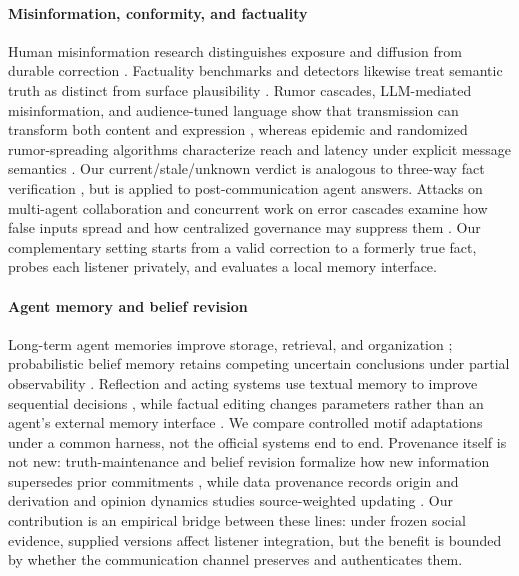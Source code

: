 \documentclass[sigconf,anonymous]{acmart}
\begin{document}
\paragraph{Misinformation, conformity, and factuality}
Human misinformation research distinguishes exposure and diffusion from durable correction
\cite{lazer2018science,vosoughi2018spread,lewandowsky2012misinformation,thorson2016belief}.
Factuality benchmarks and detectors likewise treat semantic truth as distinct from surface
plausibility
\cite{lin2022truthfulqa,manakul2023selfcheckgpt,farquhar2024detecting,li2023halueval,
niu2024ragtruth}.  Rumor cascades, LLM-mediated misinformation, and audience-tuned language show
that transmission can transform both content and expression
\cite{friggeri2014rumor,maurya2025simulating,beukeboom2019stereotypes,ye2021audience}, whereas
epidemic and randomized rumor-spreading algorithms characterize reach and latency under explicit
message semantics \cite{demers1987epidemic,karp2000rumor}.  Our
current/stale/unknown verdict is analogous to three-way fact verification
\cite{thorne2018fever}, but is applied to post-communication agent answers.  Attacks on
multi-agent collaboration and concurrent work on error cascades examine how false inputs spread
and how centralized governance may suppress them
\cite{amayuelas2024multiagent,xie2026spark}.  Our complementary setting starts from a valid
correction to a formerly true fact, probes each listener privately, and evaluates a local memory
interface.

\paragraph{Agent memory and belief revision}
Long-term agent memories improve storage, retrieval, and organization
\cite{zhong2024memorybank,packer2024memgpt,xu2025amem,chhikara2025mem0}; probabilistic belief
memory retains competing uncertain conclusions under partial observability
\cite{liao2026belief}.  Reflection and acting systems use textual memory to improve sequential
decisions \cite{shinn2023reflexion,yao2023react,wang2023voyager}, while factual editing changes
parameters rather than an agent's external memory interface \cite{meng2022rome,meng2023memit}.
We compare controlled motif adaptations under a common harness, not the official systems end to
end.  Provenance itself is not new: truth-maintenance and belief revision
formalize how new information supersedes prior commitments
\cite{doyle1979truth,alchourron1985logic}, while data provenance records origin and derivation
\cite{buneman2001provenance,moreau2013provdm} and opinion dynamics studies source-weighted
updating \cite{degroot1974reaching}.  Our contribution is an empirical bridge between these lines:
under frozen social evidence, supplied versions affect listener integration, but the benefit is
bounded by whether the communication channel preserves and authenticates them.
\end{document}
